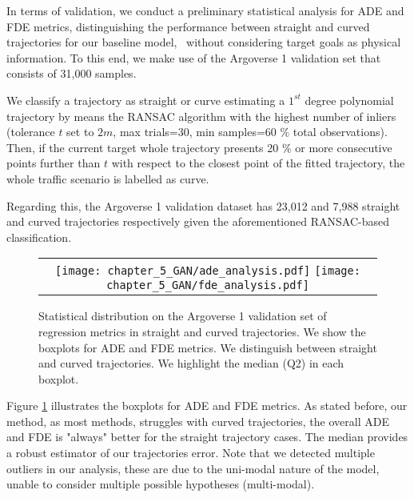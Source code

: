 In terms of validation, we conduct a preliminary statistical analysis for \ac{ADE} and \ac{FDE} metrics, distinguishing the performance between straight and curved trajectories for our baseline model, \ie \ without considering target goals as physical information. To this end, we make use of the Argoverse 1 validation set that consists of 31,000 samples.

We classify a trajectory as straight or curve estimating a $1^{st}$ degree polynomial trajectory by means the \ac{RANSAC} algorithm with the highest number of inliers (tolerance $t$ set to $2m$, max trials=$30$, min samples=$60$ \% total observations). Then, if the current target whole trajectory presents 20 \% or more consecutive points further than $t$ with respect to the closest point of the fitted trajectory, the whole traffic scenario is labelled as curve. 

Regarding this, the Argoverse 1 validation dataset has 23,012 and 7,988 straight and curved trajectories respectively given the aforementioned \ac{RANSAC}-based classification.

\begin{figure}[!ht]
	\centering
	\setlength{\tabcolsep}{2.0pt}
	\begin{tabular}{c}
		\texttt{[image: chapter\_5\_GAN/ade\_analysis.pdf]} %
		\texttt{[image: chapter\_5\_GAN/fde\_analysis.pdf]}\tabularnewline
	\end{tabular}
	\caption[Statistical distribution on the Argoverse 1 validation set of regression metrics in straight and curved trajectories]{Statistical distribution on the Argoverse 1 validation set of regression metrics in straight and curved trajectories. We show the boxplots for \ac{ADE} and \ac{FDE} metrics. We distinguish between straight and curved trajectories. We highlight the median (Q2) in each boxplot.}
	\label{fig:chapter_5_GAN/boxplots}
\end{figure}

Figure \ref{fig:chapter_5_GAN/boxplots} illustrates the boxplots for \ac{ADE} and \ac{FDE} metrics. As stated before, our method, as most methods, struggles with curved trajectories, the overall \ac{ADE} and \ac{FDE} is "always" better for the straight trajectory cases. The median provides a robust estimator of our trajectories error. Note that we detected multiple outliers in our analysis, these are due to the uni-modal nature of the model, unable to consider multiple possible hypotheses (multi-modal). 

